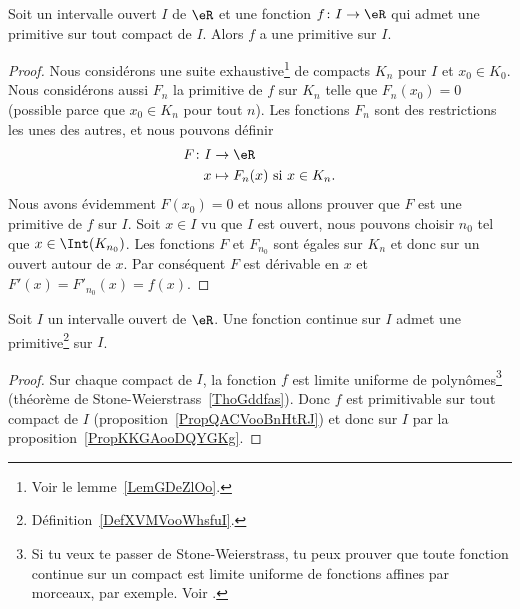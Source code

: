 \begin{proposition}        \label{PropKKGAooDQYGKg}
	Soit un intervalle ouvert \( I\) de \( \eR\) et une fonction \( f\colon I\to \eR\) qui admet une primitive sur tout compact de \( I\). Alors \( f\) a une primitive sur \( I\).
\end{proposition}

\begin{proof}
	Nous considérons une suite exhaustive\footnote{Voir le lemme~\ref{LemGDeZlOo}.} de compacts \( K_n\) pour \( I\) et \( x_0\in K_0\). Nous considérons aussi \( F_n\) la primitive de \( f\) sur \( K_n\) telle que \( F_n(x_0)=0\) (possible parce que \( x_0\in K_n\) pour tout \( n\)). Les fonctions \( F_n\) sont des restrictions les unes des autres, et nous pouvons définir
	\begin{equation}
		\begin{aligned}
			F\colon I & \to \eR                             \\
			x         & \mapsto F_n(x)\text{ si } x\in K_n.
		\end{aligned}
	\end{equation}
	Nous avons évidemment \( F(x_0)=0\) et nous allons prouver que \( F\) est une primitive de \( f\) sur \( I\). Soit \( x\in I\) vu que \( I\) est ouvert, nous pouvons choisir \( n_0\) tel que \( x\in\Int(K_{n_0})\). Les fonctions \( F\) et \( F_{n_0}\) sont égales sur \( K_n\) et donc sur un ouvert autour de \( x\). Par conséquent \( F\) est dérivable en \( x\) et \( F'(x)=F'_{n_0}(x)=f(x)\).
\end{proof}

\begin{theorem}    \label{ThoEXXyooCLwgQg}
	Soit \( I\) un intervalle ouvert de \( \eR\). Une fonction continue sur \( I\) admet une primitive\footnote{Définition~\ref{DefXVMVooWhsfuI}.} sur \( I\).
\end{theorem}

\begin{proof}
	Sur chaque compact de \( I\), la fonction \( f\) est limite uniforme de polynômes\footnote{Si tu veux te passer de Stone-Weierstrass, tu peux prouver que toute fonction continue sur un compact est limite uniforme de fonctions affines par morceaux, par exemple. Voir \cite{MQKDooSuEGxk}.} (théorème de Stone-Weierstrass~\ref{ThoGddfas}). Donc \( f\) est primitivable sur tout compact de \( I\) (proposition~\ref{PropQACVooBnHtRJ}) et donc sur \( I\) par la proposition~\ref{PropKKGAooDQYGKg}.
\end{proof}


